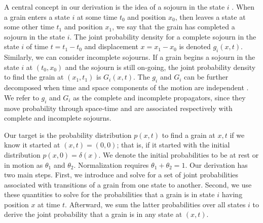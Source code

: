 \documentclass[]{agujournal2018}
\begin{document}
A central concept in our derivation is the idea of a sojourn in the state $i$ \citep{Weiss1994}.
When a grain enters a state $i$ at some time $t_0$ and position $x_0$, then leaves a state at some other time $t_1$ and position $x_1$, we say that the grain has completed a sojourn in the state $i$. The joint probability density for a complete sojourn in the state $i$ of time $t = t_1-t_0$ and displacement $x = x_1-x_0$ is denoted $g_i(x,t).$ Similarly, we can consider incomplete sojourns. If a grain begins a sojourn in the state $i$ at $(t_0,x_0)$ and the sojourn is still on-going, the joint probability density to find the grain at $(x_1,t_1)$ is $G_i(x,t)$. The $g_i$ and $G_i$ can be further decomposed when time and space components of the motion are independent \citep{Weiss1994}.
We refer to $g_i$ and $G_i$ as the complete and incomplete propagators, since they move probability through space-time and are associated respectively with complete and incomplete sojourns.

Our target is the probability distribution $p(x,t)$ to find a grain at $x,t$ if we know it started at $(x,t)=(0,0)$; that is, if it started with the initial distribution $p(x,0)=\delta(x)$.
We denote the initial probabilities to be at rest or in motion as $\theta_1$ and $\theta_2$. 
Normalization requires $\theta_1+\theta_2=1$.
Our derivation has two main steps.
First, we introduce and solve for a set of joint probabilities associated with transitions of a grain from one state to another.
Second, we use these quantities to solve for the probabilities that a grain is in state $i$ having position $x$ at time $t$.
Afterward, we sum the latter probabilities over all states $i$ to derive the joint probability that a grain is in any state at $(x,t)$.
\end{document}

